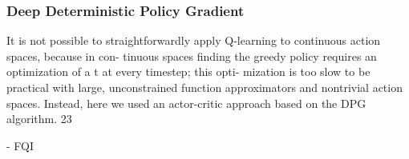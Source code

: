 \subsubsection{Deep Deterministic Policy Gradient}
It is not possible to straightforwardly apply Q-learning to continuous action spaces, because in con-
tinuous spaces finding the greedy policy requires an optimization of a t at every timestep; this opti-
mization is too slow to be practical with large, unconstrained function approximators and nontrivial
action spaces. Instead, here we used an actor-critic approach based on the DPG algorithm.
23




















- FQI

